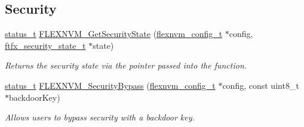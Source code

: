 \subsection*{Security}
\begin{DoxyCompactItemize}
\item 
\mbox{\hyperlink{group__ksdk__common_gaaabdaf7ee58ca7269bd4bf24efcde092}{status\+\_\+t}} \mbox{\hyperlink{group__ftfx__flexnvm__driver_ga5a1320dda499529c35382dd9f84a1a94}{F\+L\+E\+X\+N\+V\+M\+\_\+\+Get\+Security\+State}} (\mbox{\hyperlink{group__ftfx__flexnvm__driver_ga8fd4d473c0a4b30cac163160fb28a6c1}{flexnvm\+\_\+config\+\_\+t}} $\ast$config, \mbox{\hyperlink{group__ftfx__controller_gae49df85d158f3651e17d1bb660a4f1c2}{ftfx\+\_\+security\+\_\+state\+\_\+t}} $\ast$state)
\begin{DoxyCompactList}\small\item\em Returns the security state via the pointer passed into the function. \end{DoxyCompactList}\item 
\mbox{\hyperlink{group__ksdk__common_gaaabdaf7ee58ca7269bd4bf24efcde092}{status\+\_\+t}} \mbox{\hyperlink{group__ftfx__flexnvm__driver_ga16bdc534eb341b53582680955b37d740}{F\+L\+E\+X\+N\+V\+M\+\_\+\+Security\+Bypass}} (\mbox{\hyperlink{group__ftfx__flexnvm__driver_ga8fd4d473c0a4b30cac163160fb28a6c1}{flexnvm\+\_\+config\+\_\+t}} $\ast$config, const uint8\+\_\+t $\ast$backdoor\+Key)
\begin{DoxyCompactList}\small\item\em Allows users to bypass security with a backdoor key. \end{DoxyCompactList}\end{DoxyCompactItemize}
